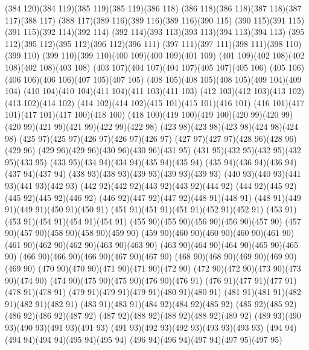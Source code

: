 \cpath (384 120)(384 119)(385 119)(385 119)(386 118)
\cpath (386 118)(386 118)(387 118)(387 117)(388 117)
\cpath (388 117)(389 116)(389 116)(389 116)(390 115)
\cpath (390 115)(391 115)(391 115)(392 114)(392 114)
\cpath (392 114)(393 113)(393 113)(394 113)(394 113)
\cpath (395 112)(395 112)(395 112)(396 112)(396 111)
\cpath (397 111)(397 111)(398 111)(398 110)(399 110)
\cpath (399 110)(399 110)(400 109)(400 109)(401 109)
\cpath (401 109)(402 108)(402 108)(402 108)(403 108)
\cpath (403 107)(404 107)(404 107)(405 107)(405 106)
\cpath (405 106)(406 106)(406 106)(407 105)(407 105)
\cpath (408 105)(408 105)(408 105)(409 104)(409 104)
\cpath (410 104)(410 104)(411 104)(411 103)(411 103)
\cpath (412 103)(412 103)(413 102)(413 102)(414 102)
\cpath (414 102)(414 102)(415 101)(415 101)(416 101)
\cpath (416 101)(417 101)(417 101)(417 100)(418 100)
\cpath (418 100)(419 100)(419 100)(420 99)(420 99)
\cpath (420 99)(421 99)(421 99)(422 99)(422 98)
\cpath (423 98)(423 98)(423 98)(424 98)(424 98)
\cpath (425 97)(425 97)(426 97)(426 97)(426 97)
\cpath (427 97)(427 97)(428 96)(428 96)(429 96)
\cpath (429 96)(429 96)(430 96)(430 96)(431 95)
\cpath (431 95)(432 95)(432 95)(432 95)(433 95)
\cpath (433 95)(434 94)(434 94)(435 94)(435 94)
\cpath (435 94)(436 94)(436 94)(437 94)(437 94)
\cpath (438 93)(438 93)(439 93)(439 93)(439 93)
\cpath (440 93)(440 93)(441 93)(441 93)(442 93)
\cpath (442 92)(442 92)(443 92)(443 92)(444 92)
\cpath (444 92)(445 92)(445 92)(445 92)(446 92)
\cpath (446 92)(447 92)(447 92)(448 91)(448 91)
\cpath (448 91)(449 91)(449 91)(450 91)(450 91)
\cpath (451 91)(451 91)(451 91)(452 91)(452 91)
\cpath (453 91)(453 91)(454 91)(454 91)(454 91)
\cpath (455 90)(455 90)(456 90)(456 90)(457 90)
\cpath (457 90)(457 90)(458 90)(458 90)(459 90)
\cpath (459 90)(460 90)(460 90)(460 90)(461 90)
\cpath (461 90)(462 90)(462 90)(463 90)(463 90)
\cpath (463 90)(464 90)(464 90)(465 90)(465 90)
\cpath (466 90)(466 90)(466 90)(467 90)(467 90)
\cpath (468 90)(468 90)(469 90)(469 90)(469 90)
\cpath (470 90)(470 90)(471 90)(471 90)(472 90)
\cpath (472 90)(472 90)(473 90)(473 90)(474 90)
\cpath (474 90)(475 90)(475 90)(476 90)(476 91)
\cpath (476 91)(477 91)(477 91)(478 91)(478 91)
\cpath (479 91)(479 91)(479 91)(480 91)(480 91)
\cpath (481 91)(481 91)(482 91)(482 91)(482 91)
\cpath (483 91)(483 91)(484 92)(484 92)(485 92)
\cpath (485 92)(485 92)(486 92)(486 92)(487 92)
\cpath (487 92)(488 92)(488 92)(488 92)(489 92)
\cpath (489 93)(490 93)(490 93)(491 93)(491 93)
\cpath (491 93)(492 93)(492 93)(493 93)(493 93)
\cpath (494 94)(494 94)(494 94)(495 94)(495 94)
\cpath (496 94)(496 94)(497 94)(497 95)(497 95)
